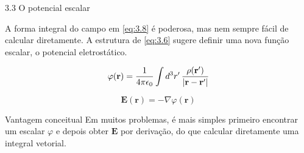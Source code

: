 \documentclass[aspectratio=169,11pt]{beamer}
\newcommand{\E}{\mathbf{E}}
\newcommand{\rr}{\mathbf{r}}
\begin{document}
\begin{frame}{3.3 O potencial escalar}
\begin{mybox}
\justifying
A forma integral do campo em \eqref{eq:3.8} é poderosa, mas nem sempre fácil de calcular diretamente.
A estrutura de \eqref{eq:3.6} sugere definir uma nova função escalar, o \alert{potencial eletrostático}.
\end{mybox}

\vspace{0.2cm}

\begin{eqbox}
\begin{equation}
\varphi(\rr)=
\frac{1}{4\pi\epsilon_0}
\int d^3r'\,
\frac{\rho(\rr')}{\abs{\rr-\rr'}}
\label{eq:3.10}
\end{equation}
\end{eqbox}

\vspace{0.15cm}

\begin{eqbox}
\begin{equation}
\E(\rr)=-\nabla\varphi(\rr)
\label{eq:3.11}
\end{equation}
\end{eqbox}

\vspace{0.15cm}

\begin{block}{Vantagem conceitual}
\justifying
Em muitos problemas, é mais simples primeiro encontrar um escalar \(\varphi\) e depois obter \(\E\) por derivação, do que calcular diretamente uma integral vetorial.
\end{block}
\end{frame}
\end{document}
